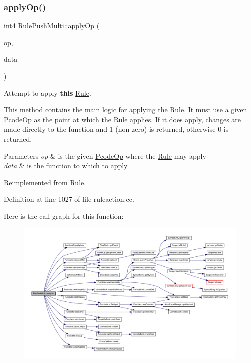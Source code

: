 \subsubsection{\texorpdfstring{applyOp()}{applyOp()}}
{\footnotesize\ttfamily int4 Rule\+Push\+Multi\+::apply\+Op (\begin{DoxyParamCaption}\item[{\mbox{\hyperlink{class_pcode_op}{Pcode\+Op}} $\ast$}]{op,  }\item[{\mbox{\hyperlink{class_funcdata}{Funcdata}} \&}]{data }\end{DoxyParamCaption})\hspace{0.3cm}{\ttfamily [virtual]}}



Attempt to apply {\bfseries{this}} \mbox{\hyperlink{class_rule}{Rule}}. 

This method contains the main logic for applying the \mbox{\hyperlink{class_rule}{Rule}}. It must use a given \mbox{\hyperlink{class_pcode_op}{Pcode\+Op}} as the point at which the \mbox{\hyperlink{class_rule}{Rule}} applies. If it does apply, changes are made directly to the function and 1 (non-\/zero) is returned, otherwise 0 is returned. 
\begin{DoxyParams}{Parameters}
{\em op} & is the given \mbox{\hyperlink{class_pcode_op}{Pcode\+Op}} where the \mbox{\hyperlink{class_rule}{Rule}} may apply \\
\hline
{\em data} & is the function to which to apply \\
\hline
\end{DoxyParams}


Reimplemented from \mbox{\hyperlink{class_rule_a4e3e61f066670175009f60fb9dc60848}{Rule}}.



Definition at line 1027 of file ruleaction.\+cc.

Here is the call graph for this function\+:
\nopagebreak
\begin{figure}[H]
\begin{center}
\leavevmode
\includegraphics[width=350pt]{class_rule_push_multi_ae0c4fc01da336893e20b3ea0fb9c4f23_cgraph}
\end{center}
\end{figure}
\mbox{\label{class_rule_push_multi_ae44a8242704738c9f0d415c3987da4b3}} 
